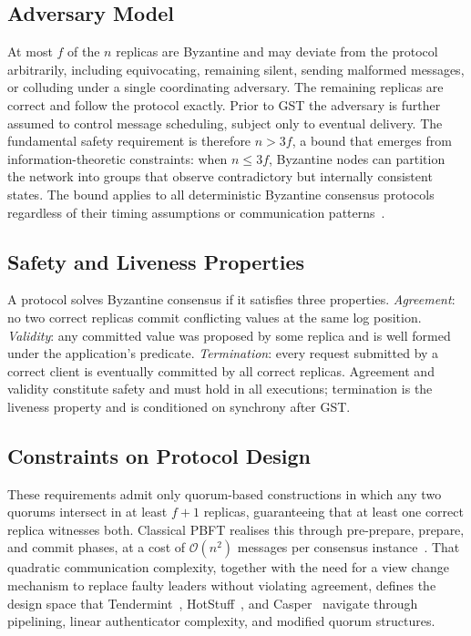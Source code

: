 \subsection{Adversary Model}

At most $f$ of the $n$ replicas are Byzantine and may deviate from the protocol arbitrarily, including equivocating, remaining silent, sending malformed messages, or colluding under a single coordinating adversary. The remaining replicas are correct and follow the protocol exactly. Prior to GST the adversary is further assumed to control message scheduling, subject only to eventual delivery. The fundamental safety requirement is therefore $n > 3f$, a bound that emerges from information-theoretic constraints: when $n \leq 3f$, Byzantine nodes can partition the network into groups that observe contradictory but internally consistent states. The bound applies to all deterministic Byzantine consensus protocols regardless of their timing assumptions or communication patterns~\cite{castro1999practical}.

\subsection{Safety and Liveness Properties}

A protocol solves Byzantine consensus if it satisfies three properties. \emph{Agreement}: no two correct replicas commit conflicting values at the same log position. \emph{Validity}: any committed value was proposed by some replica and is well formed under the application's predicate. \emph{Termination}: every request submitted by a correct client is eventually committed by all correct replicas. Agreement and validity constitute safety and must hold in all executions; termination is the liveness property and is conditioned on synchrony after GST.

\subsection{Constraints on Protocol Design}

These requirements admit only quorum-based constructions in which any two quorums intersect in at least $f+1$ replicas, guaranteeing that at least one correct replica witnesses both. Classical PBFT realises this through pre-prepare, prepare, and commit phases, at a cost of $\mathcal{O}(n^2)$ messages per consensus instance~\cite{castro1999practical}. That quadratic communication complexity, together with the need for a view change mechanism to replace faulty leaders without violating agreement, defines the design space that Tendermint~\cite{buchman2016tendermint}, HotStuff~\cite{yin2019hotstuff}, and Casper~\cite{buterin2020combining} navigate through pipelining, linear authenticator complexity, and modified quorum structures.
